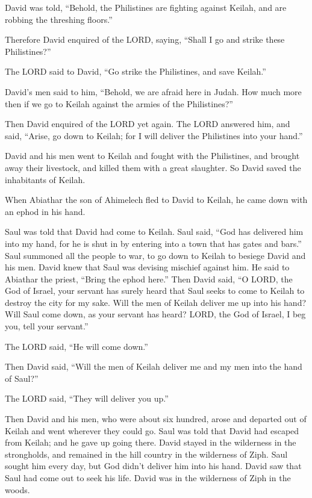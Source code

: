  David was told, ``Behold, the Philistines are fighting
against Keilah, and are robbing the threshing floors.''

 Therefore David enquired of the LORD, saying, ``Shall I go
and strike these Philistines?''

The LORD said to David, ``Go strike the Philistines, and save Keilah.''

 David's men said to him, ``Behold, we are afraid here in
Judah. How much more then if we go to Keilah against the armies of the
Philistines?''

 Then David enquired of the LORD yet again. The LORD
answered him, and said, ``Arise, go down to Keilah; for I will deliver
the Philistines into your hand.''

 David and his men went to Keilah and fought with the
Philistines, and brought away their livestock, and killed them with a
great slaughter. So David saved the inhabitants of Keilah.

 When Abiathar the son of Ahimelech fled to David to Keilah,
he came down with an ephod in his hand.

 Saul was told that David had come to Keilah. Saul said,
``God has delivered him into my hand, for he is shut in by entering into
a town that has gates and bars.''  Saul summoned all the
people to war, to go down to Keilah to besiege David and his men.
 David knew that Saul was devising mischief against him. He
said to Abiathar the priest, ``Bring the ephod here.'' 
Then David said, ``O LORD, the God of Israel, your servant has surely
heard that Saul seeks to come to Keilah to destroy the city for my sake.
 Will the men of Keilah deliver me up into his hand? Will
Saul come down, as your servant has heard? LORD, the God of Israel, I
beg you, tell your servant.''

The LORD said, ``He will come down.''

 Then David said, ``Will the men of Keilah deliver me and
my men into the hand of Saul?''

The LORD said, ``They will deliver you up.''

 Then David and his men, who were about six hundred, arose
and departed out of Keilah and went wherever they could go. Saul was
told that David had escaped from Keilah; and he gave up going there.
 David stayed in the wilderness in the strongholds, and
remained in the hill country in the wilderness of Ziph. Saul sought him
every day, but God didn't deliver him into his hand.  David
saw that Saul had come out to seek his life. David was in the wilderness
of Ziph in the woods.

